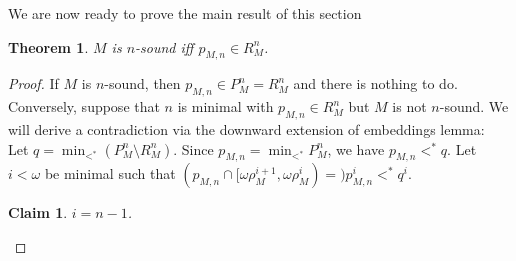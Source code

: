 \documentclass[12pt,a4paper]{article}
\theoremstyle{nicestyle}
\newtheorem{theorem}{Theorem}[subsection]
\newtheorem{claim}{Claim}[subsection]
\begin{document}
  We are now ready to prove the main result of this section

  \begin{theorem} \label{theorem: characterization of n-soundness}
    $M$ is $n$-sound iff $p_{M,n} \in R^{n}_{M}$.
  \end{theorem}

  \begin{proof}
    If $M$ is $n$-sound, then $p_{M,n} \in P^{n}_{M} = R^{n}_{M}$ and there is nothing to do. \\
    Conversely, suppose that $n$ is minimal with
    $p_{M,n} \in R^{n}_{M}$ but $M$ is not $n$-sound. We will derive a
    contradiction via the downward extension of embeddings lemma: \\

    Let $q = \min_{<^{*}} (P^{n}_{M} \setminus R^{n}_{M})$. Since
    $p_{M,n} = \min_{<^{*}} P^{n}_{M}$, we have $p_{M,n} <^{*} q$. Let
    $i < \omega$ be minimal such that
    $(p_{M,n} \cap [\omega\rho^{i+1}_{M}, \omega\rho^{i}_{M})
    =)p_{M,n}^{i} <^{*} q^{i}$.

    \begin{claim}
      $i = n-1$.
      
    \end{claim}


\end{proof}
\end{document}
